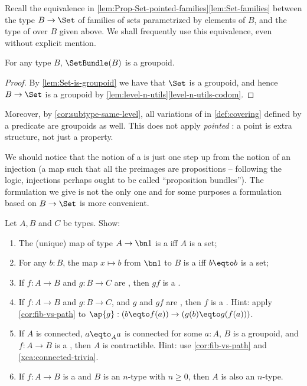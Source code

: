 Recall the equivalence in \cref{lem:Prop-Set-pointed-families}\ref{lem:Set-families}
between the type $B\to\Set$ of families of sets parametrized by elements of $B$, and the type
of \coverings over $B$ given above.
We shall frequently use this equivalence, even without explicit mention.

\begin{lemma}\label{lem:setbundle-is-groupoid}
For any type $B$, $\SetBundle(B)$ is a groupoid.
\end{lemma}
\begin{proof}
By \cref{lem:Set-is-groupoid} we have that $\Set$ is a groupoid,
and hence $B\to\Set$ is a groupoid by
\cref{lem:level-n-utils}\ref{level-n-utils-codom}.
\end{proof}
Moreover, by \cref{cor:subtype-same-level}, all variations
of \coverings in \cref{def:covering}
defined by a predicate are groupoids as well. This does not apply
\emph{pointed} \coverings:
a point is extra structure, not just a property.

We should notice that the notion of a \covering is just one step up from the notion of an
injection (a map such that all the preimages are propositions --
following the logic, injections perhaps ought to be called ``proposition bundles'').
The formulation we give is not the only one and for some purposes a formulation
based on $B\to\Set$ is more convenient.

\begin{xca}\label{xca:covering-utils}
Let $A,B$ and $C$ be types. Show:
\begin{enumerate}
\item The (unique) map of type $A\to\bn 1$ is a \covering iff $A$ is a set;
\item For any $b:B$, the map $x \mapsto b$ from $\bn 1$ to $B$ is
a \covering iff $b\eqto b$ is a set;
\item If $f: A\to B$ and $g: B\to C$ are \coverings, then $gf$ is a \covering.
\item\label{it:left-cancel-cover}
If $f: A\to B$ and $g: B\to C$, and $g$ and $gf$ are \coverings,
then $f$ is a \covering. Hint: apply \cref{cor:fib-vs-path} to
$\ap{g}: (b\eqto f(a))\to(g(b)\eqto g(f(a)))$.
\item If $A$ is connected, $a\eqto_A a$ is connected for some $a:A$,
$B$ is a groupoid, and $f: A\to B$ is a \covering, then $A$ is contractible.
Hint: use \cref{cor:fib-vs-path} and \cref{xca:connected-trivia}.
\item \label{it:cover-n-type}
If $f: A\to B$ is a \covering and $B$ is an $n$-type with $n\geq 0$,
then $A$ is also an $n$-type.\qedhere
\end{enumerate}
\end{xca}

